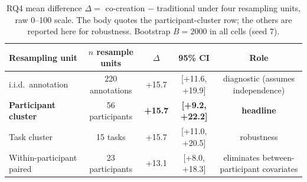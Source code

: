 \begin{table}[t]
\centering\footnotesize
\caption{RQ4 mean difference $\Delta = $ co-creation $-$ traditional under four resampling units, raw 0--100 scale. The body quotes the participant-cluster row; the others are reported here for robustness. Bootstrap $B=2000$ in all cells (seed $7$).}
\label{tbl-rq4-bootstraps}
\setlength{\tabcolsep}{4pt}
\begin{tabular*}{\textwidth}{@{\extracolsep{\fill}}lcccc@{}}
\toprule
Resampling unit & $n$ resample units & $\Delta$ & 95\% CI & Role \\
\midrule
i.i.d.\ annotation & 220 annotations & +15.7 & [+11.6, +19.9] & diagnostic (assumes independence) \\
\textbf{Participant cluster} & 56 participants & \textbf{+15.7} & \textbf{[+9.2, +22.2]} & \textbf{headline} \\
Task cluster & 15 tasks & +15.7 & [+11.0, +20.5] & robustness \\
Within-participant paired & 23 participants & +13.1 & [+8.0, +18.3] & eliminates between-participant covariates \\
\bottomrule
\end{tabular*}
\end{table}
